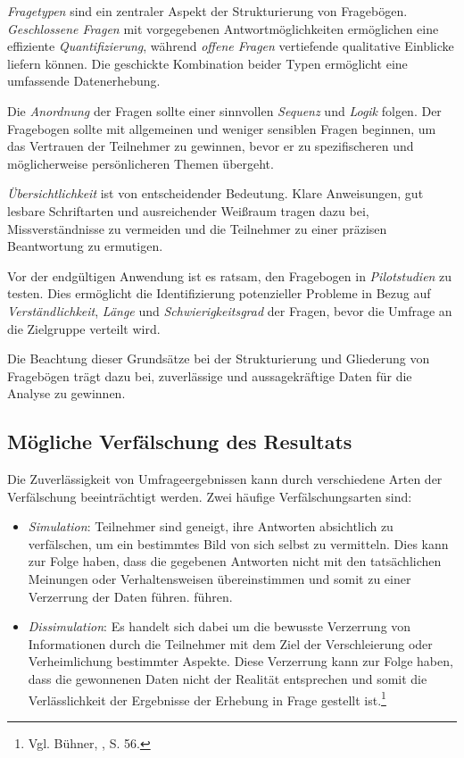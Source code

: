 \textit{Fragetypen} sind ein zentraler Aspekt der Strukturierung von Fragebögen. \textit{Geschlossene Fragen} mit vorgegebenen
Antwortmöglichkeiten ermöglichen eine effiziente \textit{Quantifizierung}, während \textit{offene Fragen} vertiefende qualitative Einblicke
liefern können. Die geschickte Kombination beider Typen ermöglicht eine umfassende Datenerhebung.

Die \textit{Anordnung} der Fragen sollte einer sinnvollen \textit{Sequenz} und \textit{Logik} folgen. Der Fragebogen sollte mit allgemeinen und
weniger sensiblen Fragen beginnen, um das Vertrauen der Teilnehmer zu gewinnen, bevor er zu spezifischeren und
möglicherweise persönlicheren Themen übergeht.

\textit{Übersichtlichkeit} ist von entscheidender Bedeutung. Klare Anweisungen, gut lesbare Schriftarten und ausreichender Weißraum
tragen dazu bei, Missverständnisse zu vermeiden und die Teilnehmer zu einer präzisen Beantwortung zu ermutigen.

Vor der endgültigen Anwendung ist es ratsam, den Fragebogen in \textit{Pilotstudien} zu testen. Dies ermöglicht die Identifizierung
potenzieller Probleme in Bezug auf \textit{Verständlichkeit}, \textit{Länge} und \textit{Schwierigkeitsgrad} der Fragen, bevor die Umfrage an die
Zielgruppe verteilt wird.

Die Beachtung dieser Grundsätze bei der Strukturierung und Gliederung von Fragebögen trägt dazu bei, zuverlässige und
aussagekräftige Daten für die Analyse zu gewinnen.

\subsection{Mögliche Verfälschung des Resultats}
Die Zuverlässigkeit von Umfrageergebnissen kann durch verschiedene Arten der Verfälschung beeinträchtigt werden. Zwei
häufige Verfälschungsarten sind:

\begin{itemize}
    \item \textit{Simulation}: Teilnehmer sind geneigt, ihre Antworten absichtlich zu verfälschen, um ein bestimmtes Bild
    von sich selbst zu vermitteln. Dies kann zur Folge haben, dass die gegebenen Antworten nicht mit den tatsächlichen
    Meinungen oder Verhaltensweisen übereinstimmen und somit zu einer Verzerrung der Daten führen. führen.

    \item \textit{Dissimulation}: Es handelt sich dabei um die bewusste Verzerrung von Informationen durch die Teilnehmer
    mit dem Ziel der Verschleierung oder Verheimlichung bestimmter Aspekte. Diese Verzerrung kann zur Folge haben, dass
    die gewonnenen Daten nicht der Realität entsprechen und somit die Verlässlichkeit der Ergebnisse der Erhebung in
    Frage gestellt ist.\footnote{Vgl. Bühner, \cite{Einfuehrung in die TEst und Fragebogenkonstruktion}, S. 56.}\\
\end{itemize}

